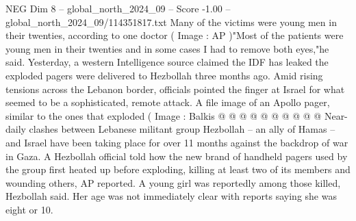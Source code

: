\begin{textsample}{NEG Dim 8 – global\_north\_2024\_09 – Score -1.00 – global\_north\_2024\_09/114351817.txt}
Many of the victims were young men in their twenties, according to one doctor ( Image : AP )"Most of the patients were young men in their twenties and in some cases I had to remove both eyes,"he said.
Yesterday, a western Intelligence source claimed the IDF has leaked the exploded pagers were delivered to Hezbollah three months ago.
Amid rising tensions across the Lebanon border, officials pointed the finger at Israel for what seemed to be a sophisticated, remote attack.
A file image of an Apollo pager, similar to the ones that exploded ( Image : Balkis @ @ @ @ @ @ @ @ @ @ Near-daily clashes between Lebanese militant group Hezbollah -- an ally of Hamas -- and Israel have been taking place for over 11 months against the backdrop of war in Gaza.
A Hezbollah official told how the new brand of handheld pagers used by the group first heated up before exploding, killing at least two of its members and wounding others, AP reported.
A young girl was reportedly among those killed, Hezbollah said.
Her age was not immediately clear with reports saying she was eight or 10.

\end{textsample}
